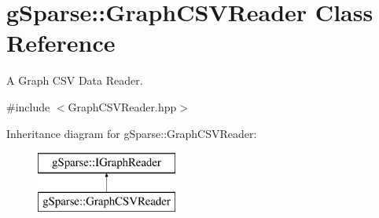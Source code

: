 \hypertarget{classg_sparse_1_1_graph_c_s_v_reader}{}\section{g\+Sparse\+:\+:Graph\+C\+S\+V\+Reader Class Reference}
\label{classg_sparse_1_1_graph_c_s_v_reader}


A Graph C\+SV Data Reader.  




{\ttfamily \#include $<$Graph\+C\+S\+V\+Reader.\+hpp$>$}

Inheritance diagram for g\+Sparse\+:\+:Graph\+C\+S\+V\+Reader\+:\begin{figure}[H]
\begin{center}
\leavevmode
\includegraphics[height=2.000000cm]{classg_sparse_1_1_graph_c_s_v_reader}
\end{center}
\end{figure}
